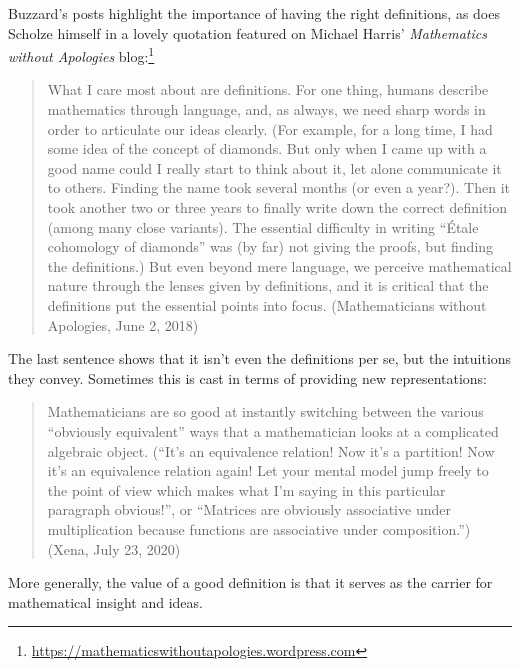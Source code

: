 \documentclass[12pt]{amsart}
\theoremstyle{definition}
\theoremstyle{remark}
\numberwithin{equation}{section}
\begin{document}
Buzzard's posts highlight the importance of having the right definitions, as does Scholze himself in a lovely quotation featured on Michael Harris' \emph{Mathematics without Apologies} blog:\footnote{\url{https://mathematicswithoutapologies.wordpress.com}}
\begin{quote}
What I care most about are definitions. For one thing, humans describe mathematics through language, and, as always, we need sharp words in order to articulate our ideas clearly. (For example, for a long time, I had some idea of the concept of diamonds. But only when I came up with a good name could I really start to think about it, let alone communicate it to others. Finding the name took several months (or even a year?). Then it took another two or three years to finally write down the correct definition (among many close variants). The essential difficulty in writing ``\'Etale cohomology of diamonds'' was (by far) not giving the proofs, but finding the definitions.) But even beyond mere language, we perceive mathematical nature through the lenses given by definitions, and it is critical that the definitions put the essential points into focus. (Mathematicians without Apologies, June 2, 2018)
\end{quote}
The last sentence shows that it isn't even the definitions per se, but the intuitions they convey. Sometimes this is cast in terms of providing new representations:
\begin{quote}
  Mathematicians are so good at instantly switching between the various ``obviously equivalent'' ways that a mathematician looks at a complicated algebraic object. (``It’s an equivalence relation! Now it’s a partition! Now it’s an equivalence relation again! Let your mental model jump freely to the point of view which makes what I'm saying in this particular paragraph obvious!'', or ``Matrices are obviously associative under multiplication because functions are associative under composition.'') (Xena, July 23, 2020)
\end{quote}
More generally, the value of a good definition is that it serves as the carrier for mathematical insight and ideas.
\end{document}
